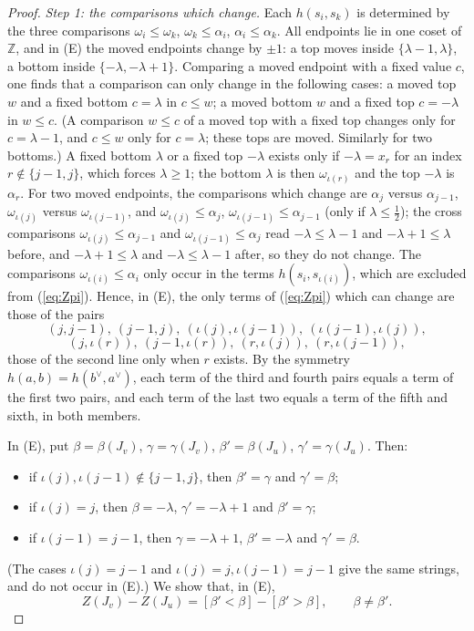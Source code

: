 \documentclass[a4paper,12pt,leqno]{amsart}
\theoremstyle{plain}
\theoremstyle{definition}
\begin{document}
\begin{proof}
\emph{Step 1: the comparisons which change.} Each $h(s_i,s_k)$ is determined by the three comparisons
$\omega_i\leq \omega_k$, $\omega_k\leq \alpha_i$, $\alpha_i\leq \alpha_k$. All endpoints lie in one coset of $\mathbb{Z}$, and in
(E) the moved endpoints change by $\pm1$: a top moves inside $\{\lambda-1,\lambda\}$, a bottom inside
$\{-\lambda,-\lambda+1\}$. Comparing a moved endpoint with a fixed value $c$, one finds that a
comparison can only change in the following cases: a moved top $w$ and a fixed bottom $c=\lambda$ in
$c\leq w$; a moved bottom $w$ and a fixed top $c=-\lambda$ in $w\leq c$. (A comparison $w\leq c$ of a
moved top with a fixed top changes only for $c=\lambda-1$, and $c\leq w$ only for $c=\lambda$; these
tops are moved. Similarly for two bottoms.) A fixed bottom $\lambda$ or a fixed top $-\lambda$ exists
only if $-\lambda=x_r$ for an index $r\notin\{j-1,j\}$, which forces $\lambda\geq1$; the bottom
$\lambda$ is then $\omega_{\iota(r)}$ and the top $-\lambda$ is $\alpha_r$. For two moved endpoints, the
comparisons which change are $\alpha_j$ versus $\alpha_{j-1}$, $\omega_{\iota(j)}$ versus $\omega_{\iota(j-1)}$, and
$\omega_{\iota(j)}\leq \alpha_j$, $\omega_{\iota(j-1)}\leq \alpha_{j-1}$ (only if $\lambda\leq\tfrac12$); the cross comparisons
$\omega_{\iota(j)}\leq \alpha_{j-1}$ and $\omega_{\iota(j-1)}\leq \alpha_j$ read $-\lambda\leq\lambda-1$ and
$-\lambda+1\leq\lambda$ before, and $-\lambda+1\leq\lambda$ and $-\lambda\leq\lambda-1$ after, so they
do not change. The comparisons $\omega_{\iota(i)}\leq \alpha_i$ only occur in the terms $h(s_i,s_{\iota(i)})$, which
are excluded from (\ref{eq:Zpi}). Hence, in (E), the only terms of (\ref{eq:Zpi}) which can change are
those of the pairs
\[(j,j-1),\ (j-1,j),\ (\iota(j),\iota(j-1)),\ (\iota(j-1),\iota(j)),\]
\[(j,\iota(r)),\ (j-1,\iota(r)),\ (r,\iota(j)),\ (r,\iota(j-1)),\]
those of the second line only when $r$ exists. By the symmetry $h(a,b)=h(b^\vee,a^\vee)$, each term of the
third and fourth pairs equals a term of the first two pairs, and each term of the last two equals a term
of the fifth and sixth, in both members.

In (E), put $\beta=\beta(J_v)$, $\gamma=\gamma(J_v)$, $\beta'=\beta(J_u)$, $\gamma'=\gamma(J_u)$. Then:
\begin{itemize}
\item if $\iota(j),\iota(j-1)\notin\{j-1,j\}$, then $\beta'=\gamma$ and $\gamma'=\beta$;
\item if $\iota(j)=j$, then $\beta=-\lambda$, $\gamma'=-\lambda+1$ and $\beta'=\gamma$;
\item if $\iota(j-1)=j-1$, then $\gamma=-\lambda+1$, $\beta'=-\lambda$ and $\gamma'=\beta$.
\end{itemize}
(The
cases $\iota(j)=j-1$ and $\iota(j)=j,\iota(j-1)=j-1$ give the same strings, and do not occur in (E).) We
show that, in (E),
\begin{equation}\label{eq:Zswap} Z(J_v)-Z(J_u)=[\beta'<\beta]-[\beta'>\beta],\qquad\beta\neq\beta'.
\end{equation}


\end{proof}
\end{document}
